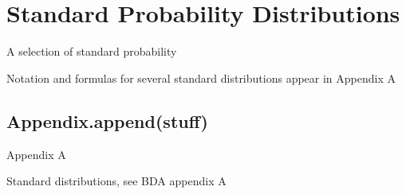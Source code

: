 \chapter{Standard Probability Distributions}\label{sec:Appendix A}

A selection of standard probability 

Notation and formulas for several standard distributions appear in Appendix A


\section{Appendix.append(stuff)}

Appendix A

Standard distributions, see BDA appendix A

